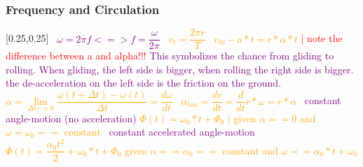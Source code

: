 \documentclass[main.tex,fontsize=8pt,paper=a4,paper=portrait,DIV=calc,]{scrartcl}
\begin{document}
\begin{multicols*}{2}
\subsubsection{Frequency and Circulation}
[0.25,0.25]
\, \newline
\large \textcolor{purple}{\( \omega = 2\pi f <=> f = \dfrac{\omega}{2\pi} \)}\newline
\, \newline
\large \textcolor{orange}{\( v_t = \dfrac{2\pi r}{T} \)}\newline
\, \newline
\large \textcolor{orange}{\( v_{t0} - a * t = r * \alpha * t \)}
\normalsize \textcolor{red}{ | note the difference between a and alpha!!!}\newline
\textcolor{purple}{This symbolizes the chance from gliding to rolling. \newline
When gliding, the left side is bigger, when rolling the right side is bigger.\newline
the de-acceleration on the left side is the friction on the ground.}
\, \newline
\large \textcolor{orange}{\( \alpha = \underset{\Delta t -> 0}{\lim} \dfrac{\omega (t + \Delta t) - \omega (t)}{\Delta t} = \dfrac{d\omega}{dt} \)}\newline 
\, \newline
\large \textcolor{orange}{\( \alpha_{tan} = \dfrac{dv}{dt} = \dfrac{d}{dt}r * \omega = r * \alpha \)}\newline 
\, \newline
\textcolor{purple}{constant angle-motion (no acceleration)}\newline
\large \textcolor{orange}{\( \Phi(t) = \omega_0 * t + \Phi_0 \)  | given \(\alpha == 0 \) and \( \omega = \omega_0 == \text{ constant} \)}\newline
\, \newline
\textcolor{purple}{constant accelerated angle-motion}\newline
\large \textcolor{orange}{\( \Phi(t) = \dfrac{\alpha_0 t^2}{2} + \omega_0 * t + \Phi_0 \) \newline given \( \alpha == \alpha_0 == \text{ constant} \) and \(\omega == \alpha_0 * t + \omega_0 \) }\newline

\end{multicols*}
\end{document}
